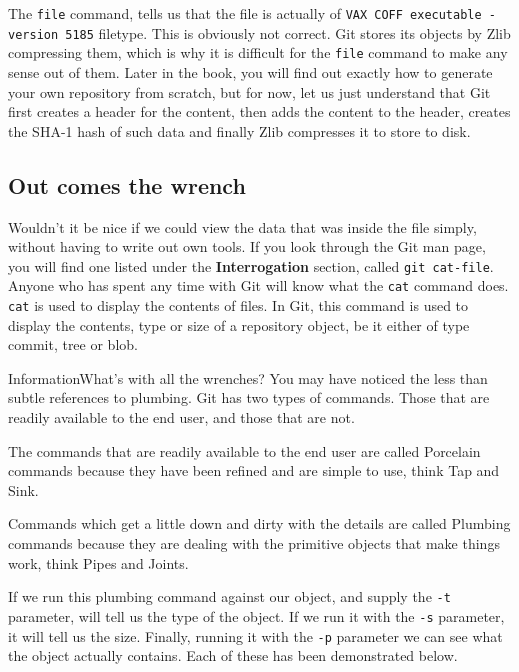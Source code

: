 The \texttt{file} command, tells us that the file is actually of \texttt{VAX COFF executable - version 5185} filetype.  This is obviously not correct.  Git stores its objects by Zlib compressing them, which is why it is difficult for the \texttt{file} command to make any sense out of them.  Later in the book, you will find out exactly how to generate your own repository from scratch, but for now, let us just understand that Git first creates a header for the content, then adds the content to the header, creates the SHA-1 hash of such data and finally Zlib compresses it to store to disk.

\subsection{Out comes the wrench}
Wouldn't it be nice if we could view the data that was inside the file simply, without having to write out own tools.  If you look through the Git man page, you will find one listed under the \textbf{Interrogation} section, called \texttt{git cat-file}.  Anyone who has spent any time with Git will know what the \texttt{cat} command does.  \texttt{cat} is used to display the contents of files.  In Git, this command is used to display the contents, type or size of a repository object, be it either of type commit, tree or blob.

\begin{callout}{Information}{What's with all the wrenches?}
You may have noticed the less than subtle references to plumbing.  Git has two types of commands.  Those that are readily available to the end user, and those that are not.  

The commands that are readily available to the end user are called Porcelain commands because they have been refined and are simple to use, think Tap and Sink.  

Commands which get a little down and dirty with the details are called Plumbing commands because they are dealing with the primitive objects that make things work, think Pipes and Joints.
\end{callout}

If we run this plumbing command against our object, and supply the \texttt{-t} parameter,  will tell us the type of the object.  If we run it with the \texttt{-s} parameter, it will tell us the size.  Finally, running it with the \texttt{-p} parameter we can see what the object actually contains.  Each of these has been demonstrated below.

